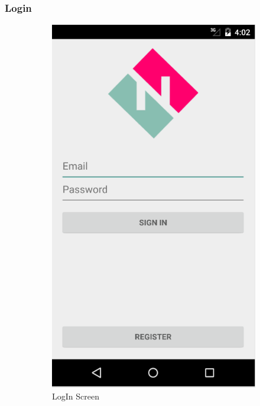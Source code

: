 \subsubsection{Login}
\begin{figure}[H]
 
\begin{subfigure}{0.5\textwidth}
\includegraphics[width=0.9\linewidth]{./Bilder/logIn.png} 
\caption{LogIn Screen}
\label{fig:login}
\end{subfigure}
\begin{subfigure}{0.5\textwidth}

\end{subfigure}
\end{figure}
